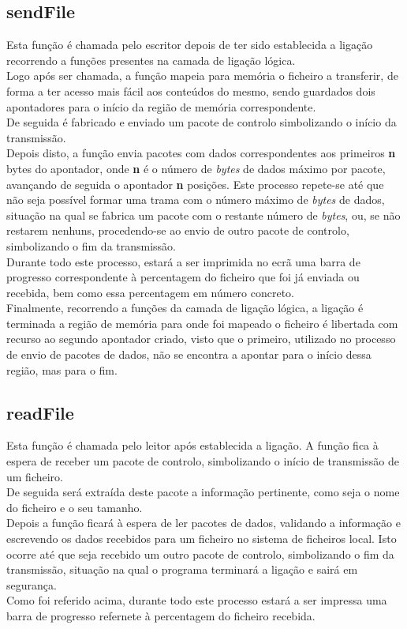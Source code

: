 \documentclass{article}
\begin{document}
\subsection{sendFile}
Esta função é chamada pelo escritor depois de ter sido establecida a ligação recorrendo a funções presentes na camada de ligação lógica.\\
Logo após ser chamada, a função mapeia para memória o ficheiro a transferir, de forma a ter acesso mais fácil aos conteúdos do mesmo, sendo guardados dois apontadores para o início da região de memória correspondente.\\
De seguida é fabricado e enviado um pacote de controlo simbolizando o início da transmissão.\\ 
Depois disto, a função envia pacotes com dados correspondentes aos primeiros \textbf{n} bytes do apontador, onde 
\textbf{n} é o número de \textit{bytes} de dados máximo por pacote, avançando de seguida o apontador \textbf{n} posições. Este processo repete-se até que não seja possível formar uma trama com o número máximo de \textit{bytes} de dados, situação na qual se fabrica um pacote com o restante número de \textit{bytes}, ou, se não restarem nenhuns, procedendo-se ao envio de outro pacote de controlo, simbolizando o fim da transmissão.\\
Durante todo este processo, estará a ser imprimida no ecrã uma barra de progresso correspondente à percentagem do ficheiro que foi já enviada ou recebida, bem como essa percentagem em número concreto.\\ 
Finalmente, recorrendo a funções da camada de ligação lógica, a ligação é terminada a região de memória para onde foi mapeado o ficheiro é libertada com recurso ao segundo apontador criado, visto que o primeiro, utilizado no processo de envio de pacotes de dados, não se encontra a apontar para o início dessa região, mas para o fim.

\subsection{readFile}
Esta função é chamada pelo leitor após establecida a ligação. A função fica à espera de receber um pacote de controlo, simbolizando o início de transmissão de um ficheiro.\\
De seguida será extraída deste pacote a informação pertinente, como seja o nome do ficheiro e o seu tamanho.\\
Depois a função ficará à espera de ler pacotes de dados, validando a informação e escrevendo os dados recebidos para um ficheiro no sistema de ficheiros local. Isto ocorre até que seja recebido um outro pacote de controlo, simbolizando o fim da transmissão, situação na qual o programa terminará a ligação e sairá em segurança.\\
Como foi referido acima, durante todo este processo estará a ser impressa uma barra de progresso refernete à percentagem do ficheiro recebida.
\end{document}
